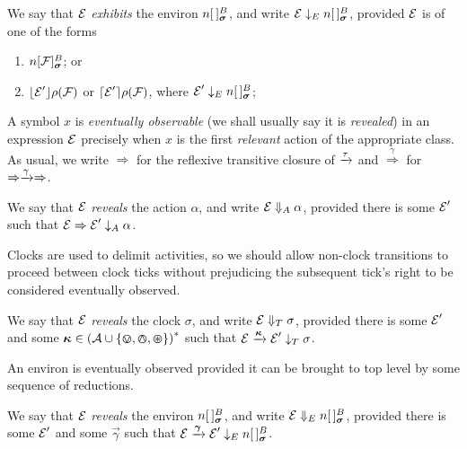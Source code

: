 \documentclass[orivec,envcountsame]{llncs}
\newcommand{\Exhibits}[1]{\mathrel{\downarrow_{#1}}}
\newcommand{\ExhibitsA}{\Exhibits{A}}
\newcommand{\ExhibitsT}{\Exhibits{T}}
\newcommand{\ExhibitsE}{\Exhibits{E}}
\newcommand{\Reveals}[1]{\mathrel{\Downarrow_{#1}}}
\newcommand{\RevealsA}{\Reveals{A}}
\newcommand{\RevealsT}{\Reveals{T}}
\newcommand{\RevealsE}{\Reveals{E}}
\newcommand{\Does}[1]{\xderives{#1}}
\newcommand{\DoesTaus}{\mathrel{\Rightarrow}}
\newcommand{\Weak}[1]{\stackrel{#1}{\Rightarrow}}
\begin{document}
\begin{definition}
We say that $\text{$\mathcal{E}$}$ \emph{exhibits} the environ $\locv{n}{\,}{B}{\vec{\sigma}}$,
and write $\expr \ExhibitsE \locv{n}{\,}{B}{\vec{\sigma}}$, provided $\text{$\mathcal{E}$}$ is 
of one of the forms

\begin{enumerate}
\item
    $\locv{n}{\exprb}{B}{\vec{\sigma}}$; or
\item
    $\lfloor{\text{$\mathcal{E}$}' }\rfloor {\rho} ({\text{$\mathcal{F}$}})$ or $\lceil{\text{$\mathcal{E}$}' }\rceil {\rho} ({\text{$\mathcal{F}$}})$,
    where $\expr' \ExhibitsE \locv{n}{\,}{B}{\vec{\sigma}}$;
\end{enumerate}
\end{definition}


A symbol $x$ is \emph{eventually observable} (we shall usually say it
is \emph{revealed}) in an expression $\text{$\mathcal{E}$}$ precisely when $x$ is the
first \emph{relevant} action of the appropriate class. As usual, we
write $\DoesTaus$ for the reflexive transitive closure of $\Does{\tau}$ and 
$\Weak{\gamma}$ for $\DoesTaus\Does{\gamma}\DoesTaus$.

\begin{definition}
We say that $\text{$\mathcal{E}$}$ \emph{reveals} the action $\alpha$, and write $\expr
\RevealsA \alpha$, provided there is some $\text{$\mathcal{E}$}'$ such that $\expr
\DoesTaus \expr' \ExhibitsA \alpha$.
\end{definition}

Clocks are used to delimit activities, so we should allow non-clock transitions
to proceed between clock ticks without prejudicing the subsequent tick's
right to be considered eventually observed.

\begin{definition}
We say that $\text{$\mathcal{E}$}$ \emph{reveals} the clock $\sigma$, and write $\expr
\RevealsT \sigma$, provided there is some $\text{$\mathcal{E}$}'$ and some $\vec{\kappa} \in
\left( \actions \cup \{ \tin, \tout, \topen \}\right)^*$ such that $\expr
\Does{\vec{\kappa}} \expr' \ExhibitsT \sigma$.
\end{definition}

An environ is eventually observed provided it can be brought to top
level by some sequence of reductions.

\begin{definition}

We say that $\text{$\mathcal{E}$}$ \emph{reveals} the environ $\locv{n}{\,}{B}{\vec{\sigma}}$,
and write $\expr \RevealsE \locv{n}{\,}{B}{\vec{\sigma}}$, provided there is
some $\text{$\mathcal{E}$}'$ and some $\vec{\gamma}$ such that $\expr \Does{\vec{\gamma}}
\expr' \ExhibitsE \locv{n}{\,}{B}{\vec{\sigma}}$.

\end{definition}
\end{document}
